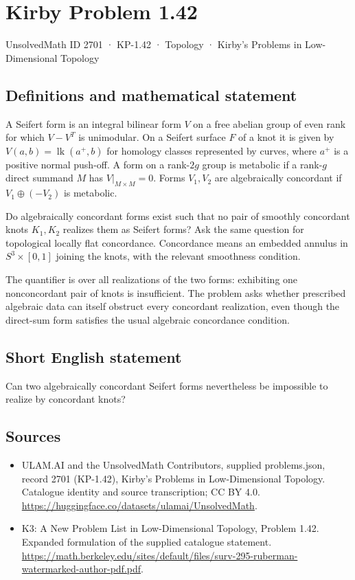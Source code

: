 \documentclass[11pt,a4paper]{article}
\begin{document}
\section*{Kirby Problem 1.42}\label{2701}
{\small UnsolvedMath ID 2701 · KP-1.42 · Topology · Kirby's Problems in Low-Dimensional Topology}
\subsection{Definitions and mathematical statement}
A Seifert form is an integral bilinear form $V$ on a free abelian group of even
rank for which $V-V^T$ is unimodular. On a Seifert surface $F$ of a knot it is
given by $V(a,b)=\operatorname{lk}(a^+,b)$ for homology classes represented by
curves, where $a^+$ is a positive normal push-off.
A form on a rank-$2g$ group is metabolic if a rank-$g$ direct summand $M$ has
$V|_{M\times M}=0$. Forms $V_1,V_2$ are algebraically concordant if
$V_1\oplus(-V_2)$ is metabolic.

Do algebraically concordant forms exist such that no pair of smoothly concordant
knots $K_1,K_2$ realizes them as Seifert forms? Ask the same question for
topological locally flat concordance. Concordance means an embedded annulus in
$S^3\times[0,1]$ joining the knots, with the relevant smoothness condition.

The quantifier is over all realizations of the two forms: exhibiting one
nonconcordant pair of knots is insufficient. The problem asks whether prescribed
algebraic data can itself obstruct every concordant realization, even though
the direct-sum form satisfies the usual algebraic concordance condition.
\subsection{Short English statement}
Can two algebraically concordant Seifert forms nevertheless be impossible to realize by concordant knots?
\subsection{Sources}
\begin{itemize}
\item[S1] ULAM.AI and the UnsolvedMath Contributors, supplied problems.json, record 2701 (KP-1.42), Kirby's Problems in Low-Dimensional Topology. Catalogue identity and source transcription; CC BY 4.0.
\url{https://huggingface.co/datasets/ulamai/UnsolvedMath}.
\item[S2] K3: A New Problem List in Low-Dimensional Topology, Problem 1.42. Expanded formulation of the supplied catalogue statement.
\url{https://math.berkeley.edu/sites/default/files/surv-295-ruberman-watermarked-author-pdf.pdf}.
\end{itemize}
\end{document}
